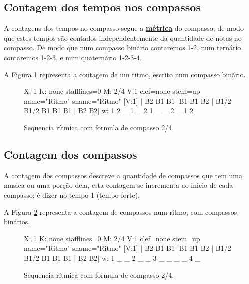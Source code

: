 \subsection{Contagem dos tempos nos compassos}
A contagens dos tempos no compasso segue a \hyperref[def:Metrica]{\textbf{métrica}}
do compasso, de modo que estes tempos são contados independentemente da quantidade de notas no compasso.
De modo que num compasso binário contaremos 1-2, num ternário contaremos 1-2-3, e
num quaternário 1-2-3-4.
\begin{example}
A Figura \ref{fig:contartempocomp1} representa a contagem de um ritmo,
escrito num compasso binário.
\end{example}
\begin{figure}[h]
    \centering
 \begin{abc}[name=abc-contartempocomp1]
%
X: 1 %
K: none stafflines=0 %
M:  2/4
V:1 clef=none stem=up name="Ritmo"   sname="Ritmo"
%
[V:1] | B2 B1 B1  |B1 B1 B2  | B1/2 B1/2 B1 B1 B1 | B2 B2|
w:      1  2  _    1  _  2     1  _ _    2  _       1  2
%       
\end{abc}
    \caption{Sequencia rítmica com formula de compasso 2/4.}\label{fig:contartempocomp1}
\end{figure}


\subsection{Contagem dos compassos}
A contagem dos compassos descreve a quantidade de compassos que tem uma musica ou uma porção dela,
esta contagem se incrementa ao inicio de cada compasso; é dizer no tempo 1 (tempo forte).
\begin{example}
A Figura \ref{fig:contarcompassos2} representa a contagem de compassos num ritmo,
com compassos binários. 
\end{example}
\begin{figure}[h]
    \centering
 \begin{abc}[name=abc-contarcompassos2]
%
X: 1 %
K: none stafflines=0 %
M:  2/4
V:1 clef=none stem=up name="Ritmo"   sname="Ritmo"
%
[V:1] | B2 B1 B1  |B1 B1 B2  | B1/2 B1/2 B1 B1 B1 | B2 B2|
w:      1  _  _    2  _  _     3  _ _    _  _       4  _
%       
\end{abc}
    \caption{Sequencia rítmica com formula de compasso 2/4.}\label{fig:contarcompassos2}
\end{figure}


